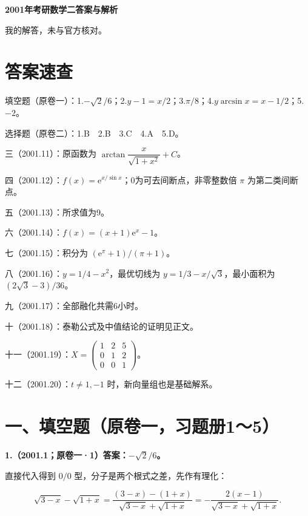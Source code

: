 \documentclass[UTF8,11pt,fontset=windows]{ctexart}
\begin{document}
{\LARGE\bfseries 2001年考研数学二答案与解析\par}\vspace{6pt}

\begingroup\color{gray}我的解答，未与官方核对。\par\endgroup

\section*{答案速查}

\begingroup\color{gray}填空题（原卷一）：1.$-\sqrt2/6$；2.$y-1=x/2$；3.$\pi/8$；4.$y\arcsin x=x-1/2$；5.$-2$。\par\endgroup

\begingroup\color{gray}选择题（原卷二）：1.B　2.B　3.C　4.A　5.D。\par\endgroup

三（2001.11）：原函数为 $\arctan\dfrac{x}{\sqrt{1+x^2}}+C$。

四（2001.12）：$f(x)=\mathrm e^{x/\sin x}$；0为可去间断点，非零整数倍 $\pi$ 为第二类间断点。

五（2001.13）：所求值为9。

六（2001.14）：$f(x)=(x+1)\mathrm e^x-1$。

七（2001.15）：积分为 $(\mathrm e^\pi+1)/(\pi+1)$。

八（2001.16）：$y=1/4-x^2$，最优切线为 $y=1/3-x/\sqrt3$，最小面积为 $(2\sqrt3-3)/36$。

九（2001.17）：全部融化共需6小时。

十（2001.18）：泰勒公式及中值结论的证明见正文。

十一（2001.19）：$X=\begin{pmatrix}1&2&5\\0&1&2\\0&0&1\end{pmatrix}$。

十二（2001.20）：$t\ne1,-1$ 时，新向量组也是基础解系。

\clearpage

\section*{一、填空题（原卷一，习题册1～5）}

\textbf{1.（2001.1；原卷一·1）答案：$-\sqrt2/6$。}

直接代入得到 $0/0$ 型，分子是两个根式之差，先作有理化：

$$
\sqrt{3-x}-\sqrt{1+x}
=\frac{(3-x)-(1+x)}{\sqrt{3-x}+\sqrt{1+x}}
=-\frac{2(x-1)}{\sqrt{3-x}+\sqrt{1+x}}.
$$
\end{document}

